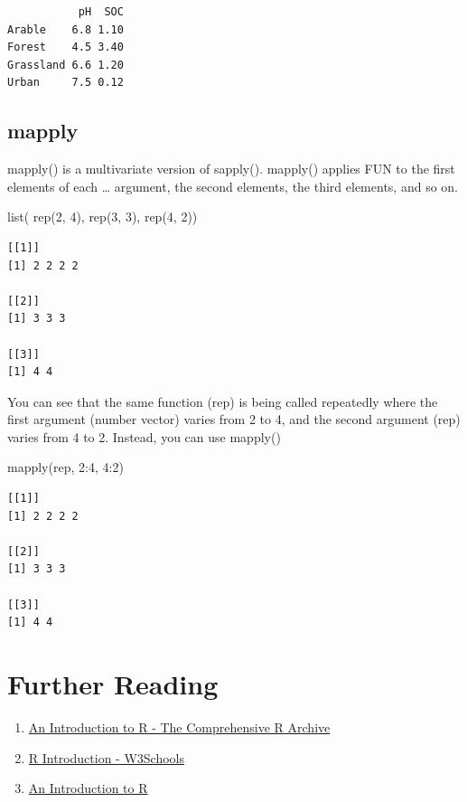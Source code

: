 \documentclass[
  letterpaper,
  DIV=11,
  numbers=noendperiod]{scrreprt}
\newenvironment{Shaded}{\begin{snugshade}}{\end{snugshade}}
\newcommand{\DecValTok}[1]{\textcolor[rgb]{0.68,0.00,0.00}{#1}}
\newcommand{\FunctionTok}[1]{\textcolor[rgb]{0.28,0.35,0.67}{#1}}
\newcommand{\NormalTok}[1]{\textcolor[rgb]{0.00,0.23,0.31}{#1}}
\newcommand{\SpecialCharTok}[1]{\textcolor[rgb]{0.37,0.37,0.37}{#1}}
\begin{document}
\begin{verbatim}
           pH  SOC
Arable    6.8 1.10
Forest    4.5 3.40
Grassland 6.6 1.20
Urban     7.5 0.12
\end{verbatim}

\hypertarget{mapply}{%
\subsection{mapply}\label{mapply}}

mapply() is a multivariate version of sapply(). mapply() applies FUN to
the first elements of each \ldots{} argument, the second elements, the
third elements, and so on.

\begin{Shaded}
\begin{Highlighting}[]
\FunctionTok{list}\NormalTok{( }\FunctionTok{rep}\NormalTok{(}\DecValTok{2}\NormalTok{, }\DecValTok{4}\NormalTok{), }\FunctionTok{rep}\NormalTok{(}\DecValTok{3}\NormalTok{, }\DecValTok{3}\NormalTok{), }\FunctionTok{rep}\NormalTok{(}\DecValTok{4}\NormalTok{, }\DecValTok{2}\NormalTok{))}
\end{Highlighting}
\end{Shaded}

\begin{verbatim}
[[1]]
[1] 2 2 2 2

[[2]]
[1] 3 3 3

[[3]]
[1] 4 4
\end{verbatim}

You can see that the same function (rep) is being called repeatedly
where the first argument (number vector) varies from 2 to 4, and the
second argument (rep) varies from 4 to 2. Instead, you can use mapply()

\begin{Shaded}
\begin{Highlighting}[]
\FunctionTok{mapply}\NormalTok{(rep, }\DecValTok{2}\SpecialCharTok{:}\DecValTok{4}\NormalTok{, }\DecValTok{4}\SpecialCharTok{:}\DecValTok{2}\NormalTok{)}
\end{Highlighting}
\end{Shaded}

\begin{verbatim}
[[1]]
[1] 2 2 2 2

[[2]]
[1] 3 3 3

[[3]]
[1] 4 4
\end{verbatim}

\hypertarget{further-reading}{%
\section{Further Reading}\label{further-reading}}

\begin{enumerate}
\def\labelenumi{\arabic{enumi}.}
\item
  \href{Networkhttps://cran.r-project.org/doc/manuals/r-release/R-intro.pdf}{An
  Introduction to R - The Comprehensive R Archive}
\item
  \href{https://www.w3schools.com/r/r_intro.asp}{R Introduction -
  W3Schools}
\item
  \href{https://intro2r.com}{An Introduction to R}
\end{enumerate}
\end{document}

